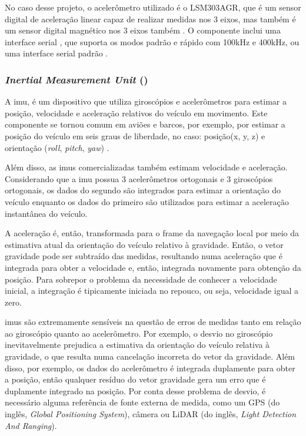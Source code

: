 \documentclass[acronym, symbols, table]{fei}
\begin{document}
				No caso desse projeto, o acelerômetro utilizado é o LSM303AGR, que é um sensor digital de aceleração linear capaz de realizar medidas nos 3 eixos, mas também é um sensor digital magnético nos 3 eixos também \cite{datasheet_accel}. O componente inclui uma interface serial , que suporta os modos padrão e rápido com 100kHz e 400kHz, ou uma interface serial padrão .
				
			\subsubsection{\textit{Inertial Measurement Unit} ()}
			
				A \acrshort{imu}, é um dispositivo que utiliza giroscópios e acelerômetros para estimar a posição, velocidade e aceleração relativos do veículo em movimento. Este componente se tornou comum em aviões e barcos, por exemplo, por estimar a posição do veículo em seis graus de liberdade, no caso: posição(x, y, z) e orientação (\textit{roll}, \textit{pitch}, \textit{yaw}) \cite{siegwart2011introduction}.
				
				Além disso, as \acrshort{imu}s comercializadas também estimam velocidade e aceleração. Considerando que a \acrshort{imu} possua 3 acelerômetros ortogonais e 3 giroscópios ortogonais, os dados do segundo são integrados para estimar a orientação do veículo enquanto os dados do primeiro são utilizados para estimar a aceleração instantânea do veículo.
				
				A aceleração é, então, transformada para o frame da navegação local por meio da estimativa atual da orientação do veículo relativo à gravidade. Então, o vetor gravidade pode ser subtraído das medidas, resultando numa aceleração que é integrada para obter a velocidade e, então, integrada novamente para obtenção da posição. Para sobrepor o problema da necessidade de conhecer a velocidade inicial, a integração é tipicamente iniciada no repouco, ou seja, velocidade igual a zero.
				
				\acrshort{imu}s são extremamente sensíveis na questão de erros de medidas tanto em relação ao giroscópio quanto ao acelerômetro. Por exemplo, o desvio no giroscópio inevitavelmente prejudica a estimativa da orientação do veículo relativa à gravidade, o que resulta numa cancelação incorreta do vetor da gravidade. Além disso, por exemplo, os dados do acelerômetro é integrada duplamente para obter a posição, então qualquer resíduo do vetor gravidade gera um erro que é duplamente integrado na posição. Por conta desse problema de desvio, é necessário alguma referência de fonte externa de medida, como um GPS (do inglês, \textit{Global Positioning System}), câmera ou LiDAR (do inglês, \textit{Light Detection And Ranging}).
		
\end{document}

